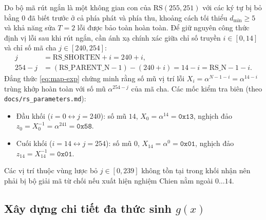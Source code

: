 \documentclass[12pt,a4paper]{report}
\begin{document}
Do bộ mã rút ngắn là một không gian con của $\text{RS}(255,251)$ với các ký tự bị bỏ bằng $0$ đã biết trước ở cả phía phát và phía thu, khoảng cách tối thiểu $d_{\min} \ge 5$ và khả năng sửa $T = 2$ lỗi được bảo toàn hoàn toàn. Để giữ nguyên công thức định vị lỗi sau khi rút ngắn, cần ánh xạ chính xác giữa chỉ số truyền $i \in [0, 14]$ và chỉ số mã cha $j \in [240, 254]$:
\begin{align}
    j &= \text{RS\_SHORTEN} + i = 240 + i, \label{eq:map-j} \\
    254 - j &= (\text{RS\_PARENT\_N} - 1) - (240 + i) = 14 - i = \text{RS\_N} - 1 - i. \label{eq:map-exp}
\end{align}
Đẳng thức \eqref{eq:map-exp} chứng minh rằng số mũ vị trí lỗi $X_i = \alpha^{N-1-i} = \alpha^{14-i}$ trùng khớp hoàn toàn với số mũ $\alpha^{254-j}$ của mã cha. Các mốc kiểm tra biên (theo \texttt{docs/rs\_parameters.md}):
\begin{itemize}
    \item Đầu khối ($i = 0 \leftrightarrow j = 240$): số mũ $14$, $X_0 = \alpha^{14} = \texttt{0x13}$, nghịch đảo $z_0 = X_0^{-1} = \alpha^{241} = \texttt{0x58}$.
    \item Cuối khối ($i = 14 \leftrightarrow j = 254$): số mũ $0$, $X_{14} = \alpha^{0} = \texttt{0x01}$, nghịch đảo $z_{14} = X_{14}^{-1} = \texttt{0x01}$.
\end{itemize}
Các vị trí thuộc vùng lược bỏ $j \in [0, 239]$ không tồn tại trong khối nhận nên phải bị bộ giải mã từ chối nếu xuất hiện nghiệm Chien nằm ngoài $0 \dots 14$.

\subsection{Xây dựng chi tiết đa thức sinh \texorpdfstring{$g(x)$}{g(x)}}
\end{document}
